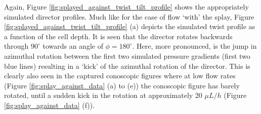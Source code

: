 Again, Figure \ref{fig:splayed_against_twist_tilt_profile} shows the appropriately simulated director profiles. Much like for the case of flow `with' the splay, Figure \ref{fig:splayed_against_twist_tilt_profile} (a) depicts the simulated twist profile as a function of the cell depth. It is seen that the director rotates backwards through $90^{\circ}$ towards an angle of $\phi=180^{\circ}$. Here, more pronounced, is the jump in azimuthal rotation between the first two simulated pressure gradients (first two blue lines) resulting in a `kick' of the azimuthal rotation of the director. This is clearly also seen in the captured conoscopic figures where at low flow rates (Figure \ref{fig:splay_against_data} (a) to (e)) the conoscopic figure has barely rotated, until a sudden kick in the rotation at approximately 20 $\mu L/h$ (Figure \ref{fig:splay_against_data} (f)).

